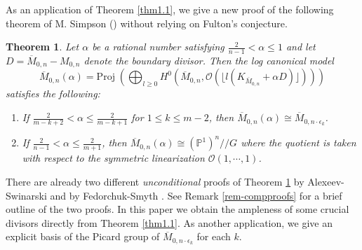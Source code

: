 \documentclass[10pt]{amsart}
\newtheorem{theorem}{Theorem}[section]
\theoremstyle{definition}
\newcommand{\PP}{\mathbb{P}}
\newcommand{\cO}{\mathcal{O} }
\newcommand{\proj}{\mathrm{Proj}\;}
\def\Mzn{\overline{M}_{0,n} }
\def\Mzek{\overline{M}_{0,n\cdot \epsilon_k} }
\def\git{/\!/ }
\begin{document}
As an application of Theorem \ref{thm1.1}, we give a new proof of
the following theorem of M. Simpson (\cite{Simpson}) without
relying on Fulton's conjecture.
\begin{theorem}\label{thm1.2}
Let $\alpha$ be a rational number satisfying $\frac{2}{n-1} < \alpha
\le 1$ and let $D=\Mzn-M_{0,n}$ denote the boundary divisor. Then
the log canonical model $$\Mzn(\alpha) = \proj\left(\bigoplus_{l \ge
0} H^0(\Mzn, \cO(\lfloor l (K_{\Mzn} +\alpha D) \rfloor))\right)
$$
satisfies the following:
\begin{enumerate} \item If $\frac{2}{m-k+2} < \alpha \le \frac{2}{m-k+1}$ for $1\le k\le
m-2$, then $\Mzn(\alpha) \cong \Mzek$.\item  If $\frac{2}{n-1} <
\alpha \le \frac{2}{m+1}$, then $\Mzn(\alpha) \cong (\PP^1)^n \git
G$ where the quotient is taken with respect to the symmetric
linearization $\cO(1,\cdots,1)$.
\end{enumerate}
\end{theorem}
There are already two different \emph{unconditional} proofs of
Theorem \ref{thm1.2} by Alexeev-Swinarski \cite{AlexSwin} and by
Fedorchuk-Smyth \cite{FedoSmyt}. See Remark \ref{rem-compproofs}
for a brief outline of the two proofs. In this paper we obtain the
ampleness of some crucial divisors directly from Theorem
\ref{thm1.1}. As another application, we give an explicit basis of
the Picard group of $\Mzek$ for each $k$.

\bigskip
\end{document}
